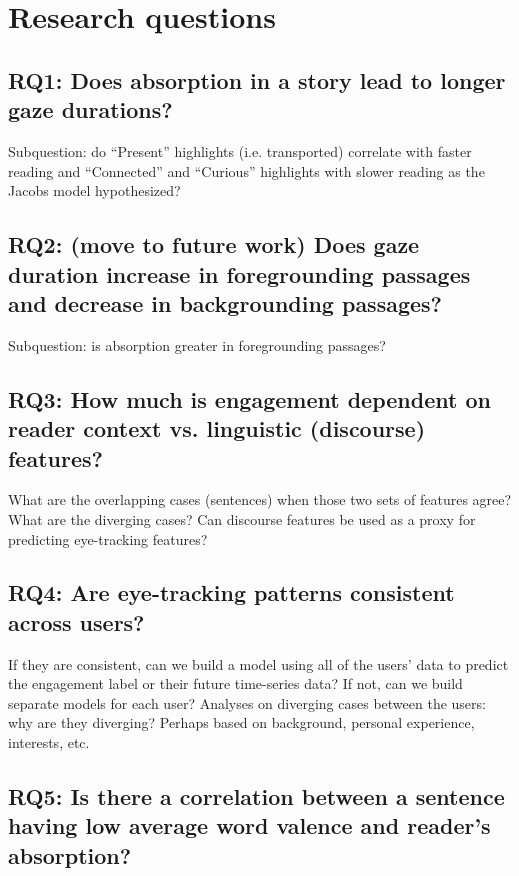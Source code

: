 \documentclass[11pt]{article}
\begin{document}
\section{Research questions}

\subsection{RQ1: Does absorption in a story lead to longer gaze durations?}

Subquestion: do “Present” highlights (i.e. transported) correlate with faster reading and “Connected” and “Curious” highlights with slower reading as the Jacobs model hypothesized?

\subsection{RQ2: (move to future work) Does gaze duration increase in foregrounding passages and decrease in backgrounding passages?}

Subquestion: is absorption greater in foregrounding passages?

\subsection{RQ3: How much is engagement dependent on reader context vs. linguistic (discourse) features?}

What are the overlapping cases (sentences) when those two sets of features agree? What are the diverging cases? Can discourse features be used as a proxy for predicting eye-tracking features?

\subsection{RQ4: Are eye-tracking patterns consistent across users?}

If they are consistent, can we build a model using all of the users’ data to predict the engagement label or their future time-series data? If not, can we build separate models for each user? Analyses on diverging cases between the users: why are they diverging? Perhaps based on background, personal experience, interests, etc.

\subsection{RQ5: Is there a correlation between a sentence having low average word valence and reader’s absorption?}
\end{document}
